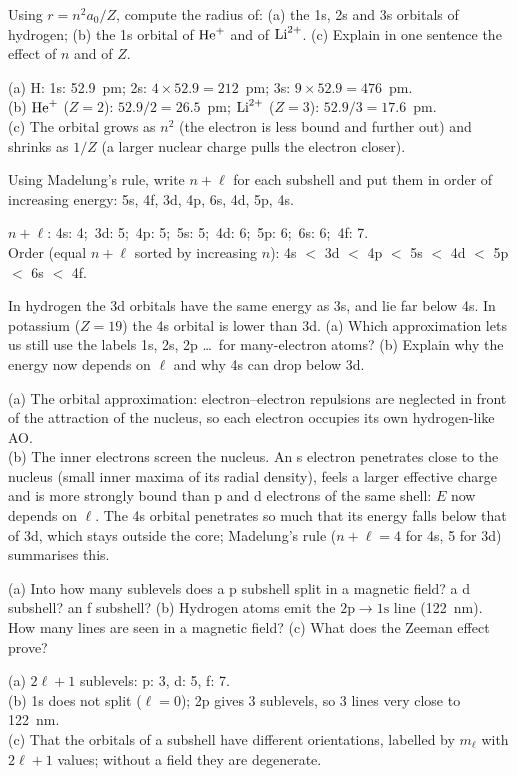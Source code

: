 Using $r = n^2a_0/Z$, compute the radius of: (a) the 1s, 2s and 3s orbitals of hydrogen;
(b) the 1s orbital of $\ce{He+}$ and of $\ce{Li^2+}$. (c) Explain in one sentence the effect of $n$ and
of $Z$.
\begin{solution}
(a) H: 1s: 52.9~pm; 2s: $4\times52.9 = 212$~pm; 3s: $9\times52.9 = 476$~pm.\\
(b) $\ce{He+}$ ($Z = 2$): $52.9/2 = 26.5$~pm; $\ce{Li^2+}$ ($Z = 3$): $52.9/3 = 17.6$~pm.\\
(c) The orbital grows as $n^2$ (the electron is less bound and further out) and shrinks as $1/Z$
(a larger nuclear charge pulls the electron closer).
\end{solution}

Using Madelung's rule, write $n+\ell$ for each subshell and put them in order of increasing energy:
5s, 4f, 3d, 4p, 6s, 4d, 5p, 4s.
\begin{solution}
$n+\ell$: 4s: 4;\ 3d: 5;\ 4p: 5;\ 5s: 5;\ 4d: 6;\ 5p: 6;\ 6s: 6;\ 4f: 7.\\
Order (equal $n+\ell$ sorted by increasing $n$): 4s $<$ 3d $<$ 4p $<$ 5s $<$ 4d $<$ 5p $<$ 6s $<$ 4f.
\end{solution}

In hydrogen the 3d orbitals have the same energy as 3s, and lie far below 4s. In potassium
($Z = 19$) the 4s orbital is lower than 3d. (a) Which approximation lets us still use the labels
1s, 2s, 2p \dots\ for many-electron atoms? (b) Explain why the energy now depends on $\ell$ and why 4s
can drop below 3d.
\begin{solution}
(a) The orbital approximation: electron--electron repulsions are neglected in front of the attraction
of the nucleus, so each electron occupies its own hydrogen-like AO.\\
(b) The inner electrons screen the nucleus. An s electron penetrates close to the nucleus (small inner
maxima of its radial density), feels a larger effective charge and is more strongly bound than p and d
electrons of the same shell: $E$ now depends on $\ell$. The 4s orbital penetrates so much that its
energy falls below that of 3d, which stays outside the core; Madelung's rule ($n+\ell = 4$ for 4s,
5 for 3d) summarises this.
\end{solution}

(a) Into how many sublevels does a p subshell split in a magnetic field? a d subshell? an f
subshell? (b) Hydrogen atoms emit the $2\mathrm p\to1\mathrm s$ line (122~nm). How many lines are seen in a
magnetic field? (c) What does the Zeeman effect prove?
\begin{solution}
(a) $2\ell+1$ sublevels: p: 3, d: 5, f: 7.\\
(b) 1s does not split ($\ell = 0$); 2p gives 3 sublevels, so 3 lines very close to 122~nm.\\
(c) That the orbitals of a subshell have different orientations, labelled by $m_\ell$ with $2\ell+1$
values; without a field they are degenerate.
\end{solution}

